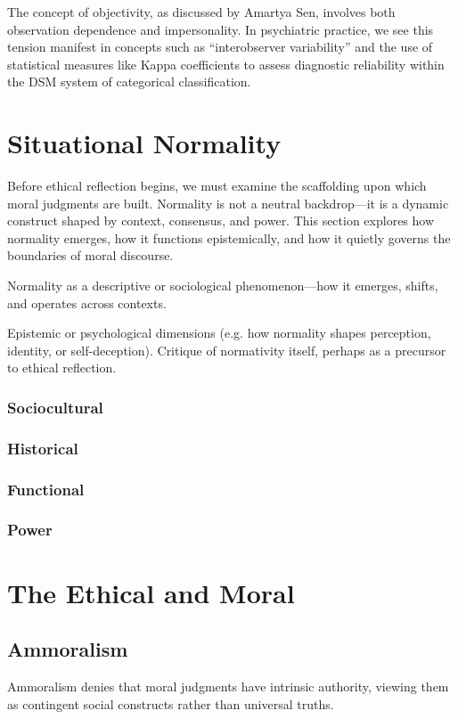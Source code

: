 \documentclass[a4paper]{article}
\begin{document}
The concept of objectivity, as discussed by Amartya Sen, involves both observation dependence and impersonality. 
In psychiatric practice, we see this tension manifest in concepts such as \enquote{interobserver variability} and the use of statistical measures like Kappa coefficients to assess diagnostic reliability within the DSM system of categorical classification.

\section{Situational Normality}
Before ethical reflection begins, we must examine the scaffolding upon which moral judgments are built. 
Normality is not a neutral backdrop—it is a dynamic construct shaped by context, consensus, and power. 
This section explores how normality emerges, how it functions epistemically, and how it quietly governs the boundaries of moral discourse.

Normality as a descriptive or sociological phenomenon—how it emerges, shifts, and operates across contexts.

Epistemic or psychological dimensions (e.g. how normality shapes perception, identity, or self-deception).
Critique of normativity itself, perhaps as a precursor to ethical reflection.

\subsubsection{Sociocultural}
\subsubsection{Historical}
\subsubsection{Functional}
\subsubsection{Power}

\section{The Ethical and Moral}
\subsection{Ammoralism}
Ammoralism denies that moral judgments have intrinsic authority, viewing them as contingent social constructs rather than universal truths.
\end{document}
